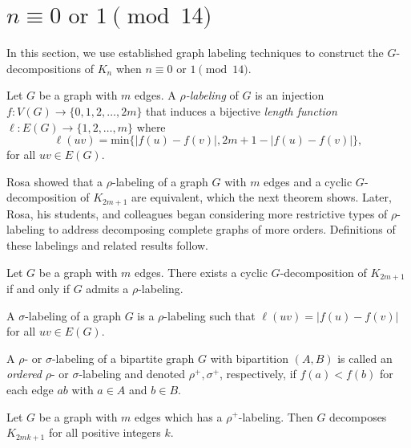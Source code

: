 \documentclass{dmgt}
\begin{document}
\section{$n \equiv 0 \textrm{ or } 1 \pmod{14}$}\label{sec:0 or 1 mod 14}

In this section, we use established graph labeling techniques to construct the $G$-decompositions of $K_n$ when $n \equiv 0 \textrm{ or } 1 \pmod{14}$. 



\begin{dnt} \label{def:rho} 
 Let $G$ be a graph with $m$ edges.  A \textit{$\rho$-labeling} of $G$ is an injection $f: V(G) \rightarrow \{0,1,2, \dots, 2m\}$ that induces a bijective \textit{length function $\ell: E(G) \rightarrow \{1,2, \dots, m\}$} where 
    $$
    \ell(uv) = \text{min}\{|f(u)-f(v)|,2m+1-|f(u)-f(v)|\},
    $$
for all  $uv \in E(G)$.
\end{dnt}

Rosa showed that a $\rho$-labeling of a graph $G$ with $m$ edges and a cyclic $G$-decomposition of $K_{2m+1}$ are equivalent, which the next theorem shows. Later, Rosa, his students, and colleagues began considering more restrictive types of $\rho$-labeling to address decomposing complete graphs of more orders. Definitions of these labelings and related results follow.

\begin{theorem}\label{thm:Rhosa}  
Let $G$ be a graph with $m$ edges.  There exists a cyclic $G$-decomposition of $K_{2m+1}$ if and only if $G$ admits a $\rho$-labeling.
\end{theorem}

\begin{dnt} \label{def:sigma} 
A $\sigma$-labeling of a graph $G$ is a $\rho$-labeling such that $\ell(uv) = |f(u) - f(v)|$ for all $uv \in E(G).$
\end{dnt}

\begin{dnt} \label{def:rho and sigma ordered def} 
A $\rho$- or $\sigma$-labeling of a bipartite graph $G$ with bipartition $(A,B)$ is called an \emph{ordered} $\rho$- or $\sigma$-labeling and denoted $\rho^+,\sigma^+$, respectively, if $f(a) < f(b)$ for each edge $ab$ with $a \in A$ and $b \in B$.
\end{dnt}

\begin{theorem} \label{thm:rho plus} 
Let $G$ be a graph with $m$ edges which has a $\rho^+$-labeling.  Then $G$ decomposes $K_{2mk+1}$ for all positive integers $k$.
\end{theorem}
\end{document}
